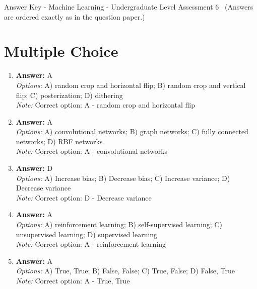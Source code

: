 \documentclass[12pt]{article}
\begin{document}
\begin{center}
Answer Key - Machine Learning - Undergraduate Level Assessment 6 \
\small (Answers are ordered exactly as in the question paper.)
\end{center}

\section*{Multiple Choice}
\begin{enumerate}[label=\arabic*.]
\item \textbf{Answer:} A
\\ \textit{Options:} A) random crop and horizontal flip; B) random crop and vertical flip; C) posterization; D) dithering
\\ \textit{Note:} Correct option: A - random crop and horizontal flip
\item \textbf{Answer:} A
\\ \textit{Options:} A) convolutional networks; B) graph networks; C) fully connected networks; D) RBF networks
\\ \textit{Note:} Correct option: A - convolutional networks
\item \textbf{Answer:} D
\\ \textit{Options:} A) Increase bias; B) Decrease bias; C) Increase variance; D) Decrease variance
\\ \textit{Note:} Correct option: D - Decrease variance
\item \textbf{Answer:} A
\\ \textit{Options:} A) reinforcement learning; B) self-supervised learning; C) unsupervised learning; D) supervised learning
\\ \textit{Note:} Correct option: A - reinforcement learning
\item \textbf{Answer:} A
\\ \textit{Options:} A) True, True; B) False, False; C) True, False; D) False, True
\\ \textit{Note:} Correct option: A - True, True
\end{enumerate}
\end{document}

